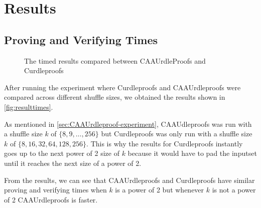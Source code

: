 \section{Results}\label{sec:results}
\subsection{Proving and Verifying Times}\label{subsec:results:provingverifying}

\begin{figure}[!htb]
    \centering
    \qquad
    \caption{The timed results compared between CAAUrdleProofs and Curdleproofs}%
    \label{fig:resulttimes}%
\end{figure}

After running the experiment where Curdleproofs and CAAUrdleproofs were compared across different shuffle sizes, we obtained the results shown in \autoref{fig:resulttimes}.

As mentioned in \autoref{sec:CAAUrdleproof-experiment}, CAAUdleproofs was run with a shuffle size $k$ of $\{8,9,\dots,256\}$ but Curdleproofs was only run with a shuffle size $k$ of $\{8,16,32,64,128,256\}$.
This is why the results for Curdleproofs instantly goes up to the next power of 2 size of $k$ because it would have to pad the inputset until it reaches the next size of a power of 2.

From the results, we can see that CAAUrdleproofs and Curdleproofs have similar proving and verifying times when $k$ is a power of 2 but whenever $k$ is not a power of 2 CAAUrdleproofs is faster.

